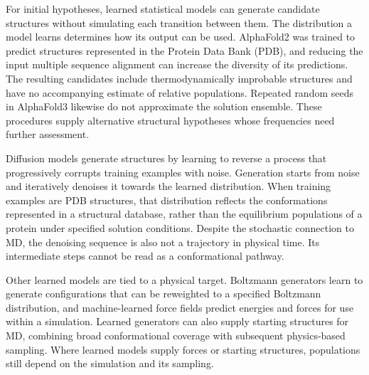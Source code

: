 For initial hypotheses, learned statistical models can generate candidate structures without simulating each transition between them. The distribution a model learns determines how its output can be used. AlphaFold2 was trained to predict structures represented in the Protein Data Bank (PDB),\supercite{jumperHighlyAccurateProtein2021} and reducing the input multiple sequence alignment can increase the diversity of its predictions. The resulting candidates include thermodynamically improbable structures and have no accompanying estimate of relative populations.\supercite{vaniAlphaFold2RAVESequenceBoltzmann2023} Repeated random seeds in AlphaFold3 likewise do not approximate the solution ensemble.\supercite{abramsonAccurateStructurePrediction2024} These procedures supply alternative structural hypotheses whose frequencies need further assessment.

Diffusion models generate structures by learning to reverse a process that progressively corrupts training examples with noise. Generation starts from noise and iteratively denoises it towards the learned distribution.\supercite{yimDiffusionModelsProtein2024} When training examples are PDB structures, that distribution reflects the conformations represented in a structural database, rather than the equilibrium populations of a protein under specified solution conditions.\supercite{wangProteinConformationGeneration2024} Despite the stochastic connection to MD, the denoising sequence is also not a trajectory in physical time. Its intermediate steps cannot be read as a conformational pathway.

Other learned models are tied to a physical target. Boltzmann generators learn to generate configurations that can be reweighted to a specified Boltzmann distribution,\supercite{noeBoltzmannGeneratorsSampling2019} and machine-learned force fields predict energies and forces for use within a simulation.\supercite{unkeBiomolecularDynamicsMachinelearned2024} Learned generators can also supply starting structures for MD, combining broad conformational coverage with subsequent physics-based sampling.\supercite{zhengMachineLearningGeneration2023} Where learned models supply forces or starting structures, populations still depend on the simulation and its sampling.

